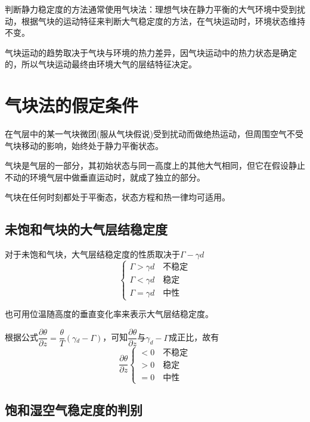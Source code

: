 \documentclass[UTF8,a4paper,11pt,oneside]{ctexbook}
\begin{document}
判断静力稳定度的方法通常使用气块法：理想气块在静力平衡的大气环境中受到扰动，根据气块的运动特征来判断大气稳定度的方法，在气块运动时，环境状态维持不变。

气块运动的趋势取决于气块与环境的热力差异，因气块运动中的热力状态是确定的，所以气块运动最终由环境大气的层结特征决定。

\section{气块法的假定条件}

在气层中的某一气块微团(服从气块假说)受到扰动而做绝热运动，但周围空气不受气块移动的影响，始终处于静力平衡状态。

气块是气层的一部分，其初始状态与同一高度上的其他大气相同，但它在假设静止不动的环境气层中做垂直运动时，就成了独立的部分。

气块在任何时刻都处于平衡态，状态方程和热一律均可适用。

\subsection{未饱和气块的大气层结稳定度}

对于未饱和气块，大气层结稳定度的性质取决于\(\Gamma-\gamma{}d\)
\begin{equation}
\begin{cases}
    \Gamma>\gamma{}d\quad\text{不稳定}\\
    \Gamma<\gamma{}d\quad\text{稳定}\\
    \Gamma=\gamma{}d\quad\text{中性}
\end{cases}
\end{equation}

也可用位温随高度的垂直变化率来表示大气层结稳定度。

根据公式\(\dfrac{\partial{}\theta}{\partial{}z}=\dfrac{\theta}{T}(\gamma{}_d-\Gamma)\)，可知\(\dfrac{\partial{}\theta}{\partial{}z}\)与\(\gamma_d-\Gamma\)成正比，故有
\begin{equation}
\dfrac{\partial{}\theta}{\partial{}z}\begin{cases}
    <0\quad\text{不稳定}\\
    >0\quad\text{稳定}\\
    =0\quad\text{中性}
\end{cases}
\end{equation}

\subsection{饱和湿空气稳定度的判别}
\end{document}
